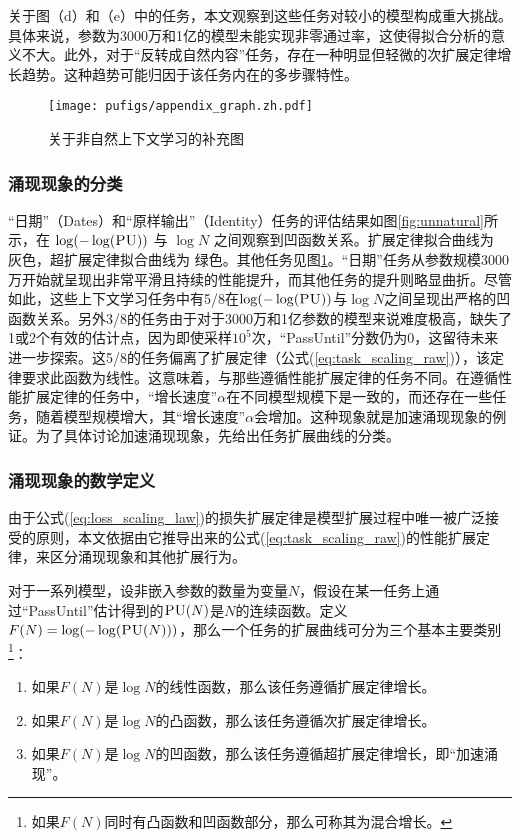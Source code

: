 {
关于图（d）和（e）中的任务，本文观察到这些任务对较小的模型构成重大挑战。具体来说，参数为3000万和1亿的模型未能实现非零通过率，这使得拟合分析的意义不大。此外，对于“反转成自然内容”任务，存在一种明显但轻微的次扩展定律增长趋势。这种趋势可能归因于该任务内在的多步骤特性。
}

\begin{figure}[!htbp]
        \centering
        \texttt{[image: pufigs/appendix\_graph.zh.pdf]}
    \caption{{关于非自然上下文学习的补充图}}
    \label{fig:appendix_unnatural}
\end{figure}

\subsubsection{涌现现象的分类}
“日期”（Dates）和“原样输出”（Identity）任务的评估结果如图\ref{fig:unnatural}所示，在 $\operatorname{log}(-\operatorname{log}(\textsc{PU}))$ 与 $\operatorname{log}N$ 之间观察到凹函数关系。扩展定律拟合曲线为 {\color[rgb]{0.55, 0.6, 0.6}灰色}，超扩展定律拟合曲线为 {\color[rgb]{0.3, 0.6, 0.45}绿色}。其他任务见图\ref{fig:appendix_unnatural}。“日期”任务从参数规模3000万开始就呈现出非常平滑且持续的性能提升，而其他任务的提升则略显曲折。尽管如此，这些上下文学习任务中有5/8在\(\log(-\log(\textsc{PU}))\)与\(\log N\)之间呈现出严格的凹函数关系。另外3/8的任务由于对于3000万和1亿参数的模型来说难度极高，缺失了1或2个有效的估计点，因为即使采样\(10^5\)次，“PassUntil”分数仍为0，这留待未来进一步探索。这5/8的任务偏离了扩展定律（公式(\ref{eq:task_scaling_raw})），该定律要求此函数为线性。这意味着，与那些遵循性能扩展定律的任务不同。在遵循性能扩展定律的任务中，“增长速度”\(\alpha\)在不同模型规模下是一致的，而还存在一些任务，随着模型规模增大，其“增长速度”\(\alpha\)会增加。这种现象就是加速涌现现象的例证。为了具体讨论加速涌现现象，先给出任务扩展曲线的分类。

\subsubsection{涌现现象的数学定义}
由于公式(\ref{eq:loss_scaling_law})的损失扩展定律是模型扩展过程中唯一被广泛接受的原则，本文依据由它推导出来的公式(\ref{eq:task_scaling_raw})的性能扩展定律，来区分涌现现象和其他扩展行为。


对于一系列模型，设非嵌入参数的数量为变量\(N\)，假设在某一任务上通过“PassUntil”估计得到的\(\textsc{PU}(N)\)是\(N\)的连续函数。定义\(F(N) = \operatorname{log}(-\operatorname{log}(\textsc{PU}(N)))\)，{那么一个任务的扩展曲线可分为三个基本主要类别\footnote{如果\(F(N)\)同时有凸函数和凹函数部分，那么可称其为混合增长。}：}
\begin{enumerate}
    \item 如果\(F(N)\)是\(\operatorname{log}N\)的线性函数，那么该任务遵循扩展定律增长。
    \item 如果\(F(N)\)是\(\operatorname{log}N\)的凸函数，那么该任务遵循次扩展定律增长。
    \item 如果\(F(N)\)是\(\operatorname{log}N\)的凹函数，那么该任务遵循超扩展定律增长，即“加速涌现”。
\end{enumerate}


